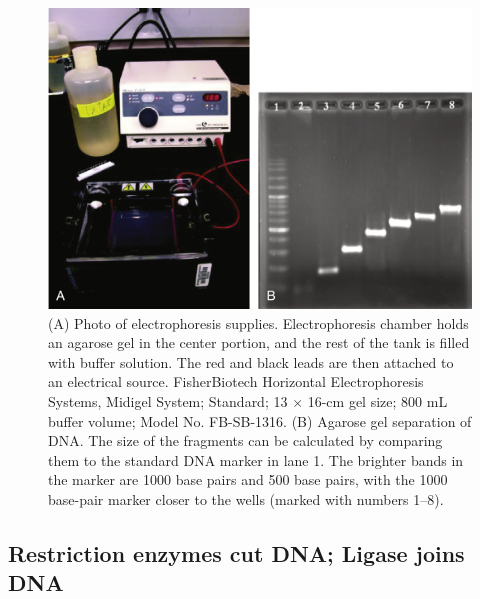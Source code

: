 \documentclass[nofonts,]{tufte-handout}
\begin{document}
\begin{figure}
\includegraphics[width=0.95\linewidth]{./images/electrophoresis} \caption[(A) Photo of electrophoresis supplies]{(A) Photo of electrophoresis supplies. Electrophoresis chamber holds an agarose gel in the center portion, and the rest of the tank is filled with buffer solution. The red and black leads are then attached to an electrical source. FisherBiotech Horizontal Electrophoresis Systems, Midigel System; Standard; 13 $\times$ 16-cm gel size; 800 mL buffer volume; Model No. FB-SB-1316. (B) Agarose gel separation of DNA. The size of the fragments can be calculated by comparing them to the standard DNA marker in lane 1. The brighter bands in the marker are 1000 base pairs and 500 base pairs, with the 1000 base-pair marker closer to the wells (marked with numbers 1–8).}\label{fig:gel-electrophoresis}
\end{figure}


\hypertarget{restriction-enzymes-cut-dna-ligase-joins-dna}{%
\subsection{Restriction enzymes cut DNA; Ligase joins
DNA}\label{restriction-enzymes-cut-dna-ligase-joins-dna}}
\end{document}
